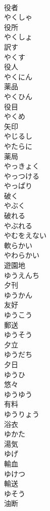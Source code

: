 \documentclass[8pt]{extreport}
\begin{document}
\begin{CJK}{UTF8}{min}
\\	役者 
\\	やくしゃ	
\\	役所 
\\	やくしょ	
\\	訳す 
\\	やくす	
\\	役人 
\\	やくにん	
\\	薬品 
\\	やくひん	
\\	役目 
\\	やくめ	
\\	矢印 
\\	やじるし	
\\	やたらに	
\\	薬局 
\\	やっきょく	
\\	やっつける	
\\	やっぱり	
\\	破く 
\\	やぶく	
\\	破れる 
\\	やぶれる	
\\	やむをえない	
\\	軟らかい 
\\	やわらかい	
\\	遊園地 
\\	ゆうえんち	
\\	夕刊 
\\	ゆうかん	
\\	友好 
\\	ゆうこう	
\\	郵送 
\\	ゆうそう	
\\	夕立 
\\	ゆうだち	
\\	夕日 
\\	ゆうひ	
\\	悠々 
\\	ゆうゆう	
\\	有料 
\\	ゆうりょう	
\\	浴衣 
\\	ゆかた	
\\	湯気 
\\	ゆげ	
\\	輸血 
\\	ゆけつ	
\\	輸送 
\\	ゆそう	
\\	油断 

\end{CJK}
\end{document}
